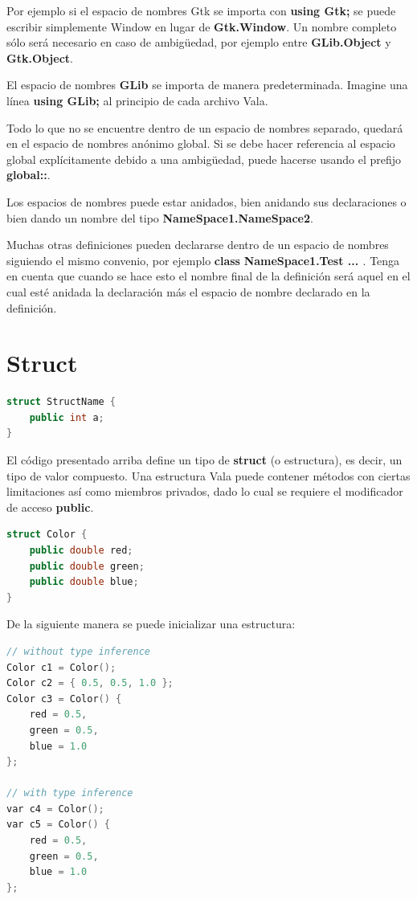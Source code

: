 \documentclass[12pt,twoside]{book}
\begin{document}
Por ejemplo si el espacio de nombres Gtk se importa con \textbf{using Gtk;} se puede escribir simplemente Window en lugar de \textbf{Gtk.Window}. Un nombre completo sólo será necesario en caso de ambigüedad, por ejemplo entre \textbf{GLib.Object} y \textbf{Gtk.Object}.

El espacio de nombres \textbf{GLib} se importa de manera predeterminada. Imagine una línea \textbf{using GLib;} al principio de cada archivo Vala.

Todo lo que no se encuentre dentro de un espacio de nombres separado, quedará en el espacio de nombres anónimo global. Si se debe hacer referencia al espacio global explícitamente debido a una ambigüedad, puede hacerse usando el prefijo \textbf{global::}.

Los espacios de nombres puede estar anidados, bien anidando sus declaraciones o bien dando un nombre del tipo \textbf{NameSpace1.NameSpace2}.

Muchas otras definiciones pueden declararse dentro de un espacio de nombres siguiendo el mismo convenio, por ejemplo \textbf{class} \textbf{NameSpace1.Test { ... }}. Tenga en cuenta que cuando se hace esto el nombre final de la definición será aquel en el cual esté anidada la declaración más el espacio de nombre declarado en la definición.

\section{Struct}

\begin{lstlisting}[language=C++]
struct StructName {
	public int a;
}
\end{lstlisting}

El código presentado arriba define un tipo de \textbf{struct} (o estructura), es decir, un tipo de valor compuesto. Una estructura Vala puede contener métodos con ciertas limitaciones así como miembros privados, dado lo cual se requiere el modificador de acceso \textbf{public}.

\begin{lstlisting}[language=C++]
struct Color {
	public double red;
	public double green;
	public double blue;
}
\end{lstlisting}

De la siguiente manera se puede inicializar una estructura:

\begin{lstlisting}[language=C++]
// without type inference
Color c1 = Color();
Color c2 = { 0.5, 0.5, 1.0 };
Color c3 = Color() {
	red = 0.5,
	green = 0.5,
	blue = 1.0
};

// with type inference
var c4 = Color();
var c5 = Color() {
	red = 0.5,
	green = 0.5,
	blue = 1.0
};
\end{lstlisting}
\end{document}
